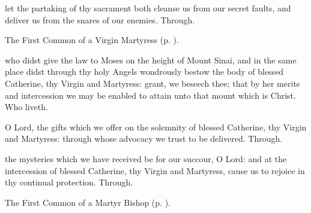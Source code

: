 \vspace{-0.5\baselineskip}

\postcommunion

\vspace{-0.25\baselineskip}

 let the partaking of thy sacrament both cleanse us from our secret faults, and deliver us from the snares of our enemies. Through.



\vspace{-0.75\baselineskip}


\begin{secrubric}
	The First Common of a Virgin Martyress (p. \pageref{CommonVirginMartyrI}).
\end{secrubric}

\vspace{-0.75\baselineskip}

\collect

\vspace{-0.25\baselineskip}

 who didst give the law to Moses on the height of Mount Sinai, and in the same place didst through thy holy Angels wondrously bestow the body of blessed Catherine, thy Virgin and Martyress: grant, we beseech thee; that by her merits and intercession we may be enabled to attain unto that mount which is Christ. Who liveth.

\vspace{-0.5\baselineskip}

\secret

\vspace{-0.25\baselineskip}

 O Lord, the gifts which we offer on the solemnity of blessed Catherine, thy Virgin and Martyress: through whose advocacy we trust to be delivered. Through.

\vspace{-0.5\baselineskip}

\postcommunion

\vspace{-0.25\baselineskip}

 the mysteries which we have received be for our succour, O Lord: and at the intercession of blessed Catherine, thy Virgin and Martyress, cause us to rejoice in thy continual protection. Through.


\vspace{-0.75\baselineskip}


\begin{secrubric}
	The First Common of a Martyr Bishop (p. \pageref{CommonMartyrBishopI}).
\end{secrubric}

